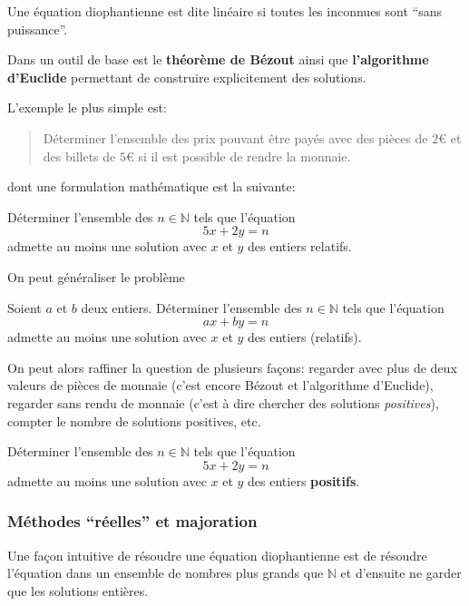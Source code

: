 Une équation diophantienne est dite linéaire si toutes les inconnues
sont ``sans puissance''.

Dans un outil de base est le \textbf{théorème de Bézout} ainsi que
\textbf{l'algorithme d'Euclide} permettant de construire explicitement
des solutions.

L'exemple le plus simple est:

\begin{quote}
  Déterminer l'ensemble des prix pouvant être payés avec des pièces de $2€$ et des billets de $5€$ si il est possible de rendre la monnaie.
\end{quote}

dont une formulation mathématique est la suivante:

\begin{exo}
  Déterminer l'ensemble des $n \in \mathbb{N}$ tels que l'équation
  \[5x+2y=n\]
  admette au moins une solution avec $x$ et $y$ des entiers relatifs.
\end{exo}

On peut généraliser le problème

\begin{exo}
  Soient $a$ et $b$ deux entiers.
  Déterminer l'ensemble des $n \in \mathbb{N}$ tels que l'équation
  \[ax+by=n\]
  admette au moins une solution avec $x$ et $y$ des entiers (relatifs).
\end{exo}


On peut alors raffiner la question de plusieurs façons: regarder avec plus de deux valeurs de pièces de monnaie (c'est encore Bézout et l'algorithme d'Euclide), regarder sans rendu de monnaie (c'est à dire chercher des solutions \emph{positives}), compter le nombre de solutions positives, etc.


\begin{exo}
  Déterminer l'ensemble des $n \in \mathbb{N}$ tels que l'équation
  \[5x+2y=n\]
  admette au moins une solution avec $x$ et $y$ des entiers \textbf{positifs}.
\end{exo}

\subsubsection{Méthodes ``réelles'' et majoration}

Une façon intuitive de résoudre une équation diophantienne est de résoudre l'équation dans un ensemble de nombres plus grands que $\mathbb{N}$ et d'ensuite ne garder que les solutions entières.

